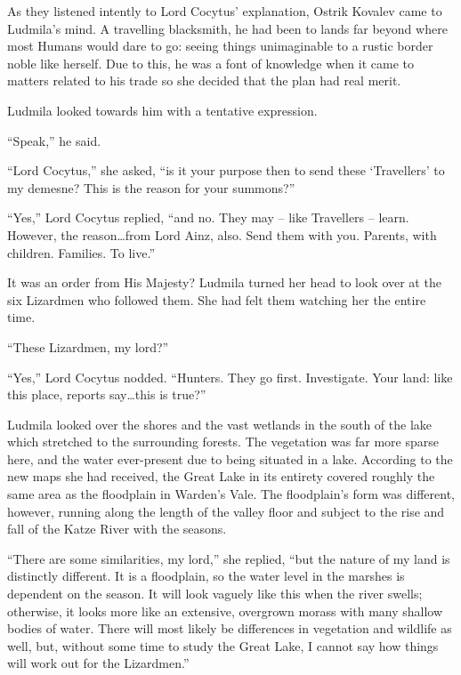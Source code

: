  

As they listened intently to Lord Cocytus’ explanation, Ostrik Kovalev came to Ludmila’s mind. A travelling blacksmith, he had been to lands far beyond where most Humans would dare to go: seeing things unimaginable to a rustic border noble like herself. Due to this, he was a font of knowledge when it came to matters related to his trade so she decided that the plan had real merit.

 

Ludmila looked towards him with a tentative expression.

 

“Speak,” he said.

 

“Lord Cocytus,” she asked, “is it your purpose then to send these ‘Travellers’ to my demesne? This is the reason for your summons?”

 

“Yes,” Lord Cocytus replied, “and no. They may – like Travellers – learn. However, the reason…from Lord Ainz, also. Send them with you. Parents, with children. Families. To live.”

 

It was an order from His Majesty? Ludmila turned her head to look over at the six Lizardmen who followed them. She had felt them watching her the entire time.

 

“These Lizardmen, my lord?”

 

“Yes,” Lord Cocytus nodded. “Hunters. They go first. Investigate. Your land: like this place, reports say…this is true?”

 

Ludmila looked over the shores and the vast wetlands in the south of the lake which stretched to the surrounding forests. The vegetation was far more sparse here, and the water ever-present due to being situated in a lake. According to the new maps she had received, the Great Lake in its entirety covered roughly the same area as the floodplain in Warden’s Vale. The floodplain’s form was different, however, running along the length of the valley floor and subject to the rise and fall of the Katze River with the seasons.

 

“There are some similarities, my lord,” she replied, “but the nature of my land is distinctly different. It is a floodplain, so the water level in the marshes is dependent on the season. It will look vaguely like this when the river swells; otherwise, it looks more like an extensive, overgrown morass with many shallow bodies of water. There will most likely be differences in vegetation and wildlife as well, but, without some time to study the Great Lake, I cannot say how things will work out for the Lizardmen.”

